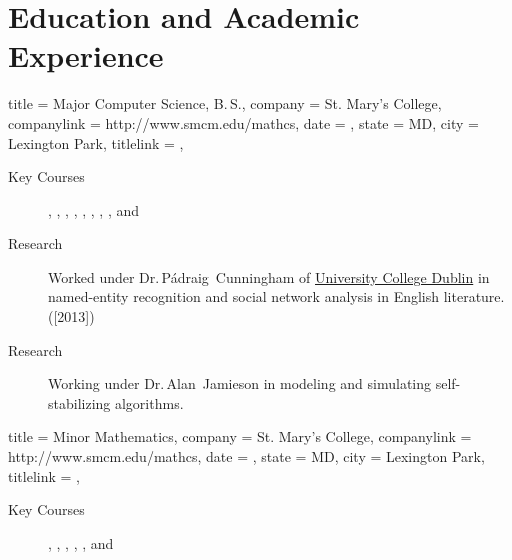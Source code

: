 \documentclass[
textout=\jobname.cv.txt,
textout preamble = preamble.txt,
]{bettercv}
\begin{document}
\section{Education and Academic Experience}
\begin{position}
  {
    title   = {Major \Dash Computer Science, B.\,S.},
    company = St. Mary's College,
    companylink = http://www.smcm.edu/mathcs,
    date    = ,
    state   = MD,
    city    = Lexington Park,
    titlelink = \transcript,
  }

\begin{description}
\item[Key Courses]
  ,
  ,
  ,
  ,
  ,
  ,
  ,
  ,
  and 
\item[Research] Worked under
  Dr.\,P\'adraig~Cunningham of \href{http://www.ucd.ie}{University
    College Dublin} in named-entity recognition and social network
  analysis in English literature. ([2013])
\item[Research] Working under Dr.\,Alan~Jamieson in modeling and
  simulating self-stabilizing algorithms.
\end{description}
\end{position}

\begin{position}
  {
    title   = Minor \Dash Mathematics,
    company = St. Mary's College,
    companylink = http://www.smcm.edu/mathcs,
    date    = ,
    state   = MD,
    city    = Lexington Park,
    titlelink = \transcript,
  }

  \begin{description}
  \item[Key Courses]
    ,
    ,
    ,
    ,
    ,
    and 
  \end{description}
\end{position}
\end{document}
